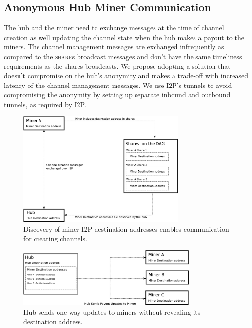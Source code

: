 \documentclass{article}
\begin{document}
\subsection{Anonymous Hub Miner
  Communication}\label{sec:hub-miner-communication}

The hub and the miner need to exchange messages at the time of channel
creation as well updating the channel state when the hub makes a
payout to the miners. The channel management messages are exchanged
infrequently as compared to the \textsc{share}s broadcast messages and
don't have the same timeliness requirements as the shares
broadcasts. We propose adopting a solution that doesn't compromise on
the hub's anonymity and makes a trade-off with increased latency of
the channel management messages. We use I2P's tunnels to avoid
compromising the anonymity by setting up separate inbound and outbound
tunnels, as required by I2P.

\begin{figure}
  \begin{center}
    \includegraphics[width=0.75\textwidth]{new-miner-communication.eps}
    \caption{Discovery of miner I2P destination addresses enables
      communication for creating channels.}\label{fig:new-miner-communication}
  \end{center}
\end{figure}

\begin{figure}
  \begin{center}
    \includegraphics[width=0.8\textwidth]{payout-communication.eps}
    \caption{Hub sends one way updates to miners without revealing its
      destination address.}\label{fig:new-miner-communication}
  \end{center}
\end{figure}
\end{document}
